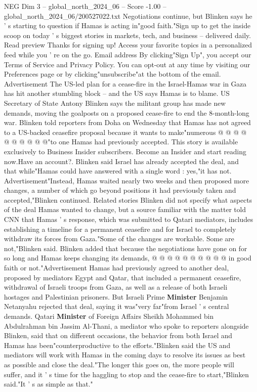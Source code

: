 \begin{textsample}{NEG Dim 3 – global\_north\_2024\_06 – Score -1.00 – global\_north\_2024\_06/200527022.txt}  \label{ex:f3_neg_397}
Negotiations continue, but Blinken says he ' s starting to question if Hamas is acting in"good faith."Sign up to get the inside scoop on today ' s biggest stories in markets, tech, and business -- delivered daily.
Read preview Thanks for signing up!
Access your favorite topics in a personalized feed while you ' re on the go.
Email address By clicking"Sign Up", you accept our Terms of Service and Privacy Policy.
You can opt-out at any time by visiting our Preferences page or by clicking"unsubscribe"at the bottom of the email.
Advertisement The US-led plan for a cease-fire in the Israel-Hamas war in Gaza has hit another stumbling block -- and the US says Hamas is to blame.
US Secretary of State Antony Blinken says the militant group has made new demands, moving the goalposts on a proposed cease-fire to end the 8-month-long war.
Blinken told reporters from Doha on Wednesday that Hamas has not agreed to a US-backed ceasefire proposal because it wants to make"numerous @ @ @ @ @ @ @ @ @ @"to one Hamas had previously accepted.
This story is available exclusively to Business Insider subscribers.
Become an Insider and start reading now.Have an account?.
Blinken said Israel has already accepted the deal, and that while"Hamas could have answered with a single word : yes,"it has not.
Advertisement"Instead, Hamas waited nearly two weeks and then proposed more changes, a number of which go beyond positions it had previously taken and accepted,"Blinken continued.
Related stories Blinken did not specify what aspects of the deal Hamas wanted to change, but a source familiar with the matter told CNN that Hamas ' s response, which was submitted to Qatari mediators, includes establishing a timeline for a permanent ceasefire and for Israel to completely withdraw its forces from Gaza."Some of the changes are workable.
Some are not,"Blinken said.
Blinken added that because the negotiations have gone on for so long and Hamas keeps changing its demands, @ @ @ @ @ @ @ @ @ @ in good faith or not."Advertisement Hamas had previously agreed to another deal, proposed by mediators Egypt and Qatar, that included a permanent ceasefire, withdrawal of Israeli troops from Gaza, as well as a release of both Israeli hostages and Palestinian prisoners.
But Israeli Prime \textbf{Minister} Benjamin Netanyahu rejected that deal, saying it was"very far"from Israel ' s central demands.
Qatari \textbf{Minister} of Foreign Affairs Sheikh Mohammed bin Abdulrahman bin Jassim Al-Thani, a mediator who spoke to reporters alongside Blinken, said that on different occasions, the behavior from both Israel and Hamas has been"counterproductive to the efforts."Blinken said the US and mediators will work with Hamas in the coming days to resolve its issues as best as possible and close the deal."The longer this goes on, the more people will suffer, and it ' s time for the haggling to stop and the cease-fire to start,"Blinken said."It ' s as simple as that."

\end{textsample}
